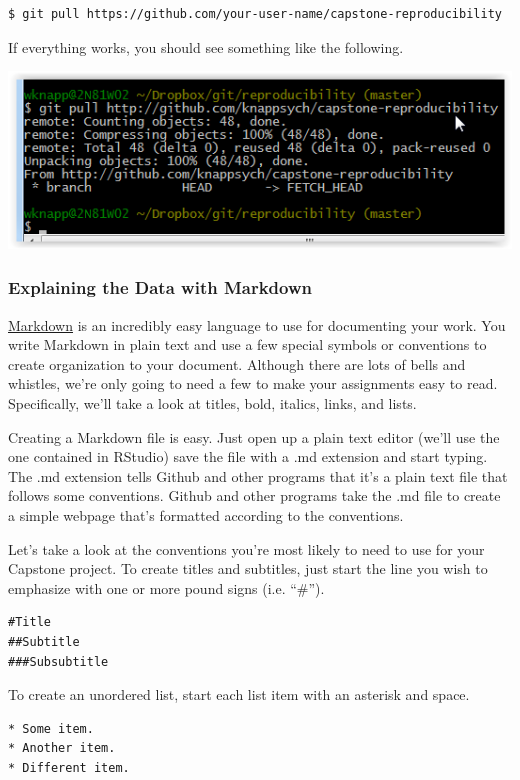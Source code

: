 \documentclass[12pt]{article}
\begin{document}
\begin{verbatim}
$ git pull https://github.com/your-user-name/capstone-reproducibility
\end{verbatim}

If everything works, you should see something like the following.

\includegraphics{imgs/Github08.PNG}

\subsubsection{Explaining the Data with Markdown}
\href{http://en.wikipedia.org/wiki/Markdown}{Markdown} is an incredibly easy language to use for
documenting your work. You write Markdown in plain text and use a few special symbols or conventions
to create organization to your document. Although there are lots of bells and whistles, we're only
going to need a few to make your assignments easy to read. Specifically, we'll take a look at titles,
bold, italics, links, and lists.

Creating a Markdown file is easy. Just open up a plain text editor (we'll use the one contained in
RStudio) save the file with a .md extension and start typing. The .md extension tells Github and
other programs that it's a plain text file that follows some conventions. Github and other programs
take the .md file to create a simple webpage that's formatted according to the conventions. 

Let's take a look at the conventions you're most likely to need to use for your Capstone project. To
create titles and subtitles, just start the line you wish to emphasize with one or more pound signs
(i.e. ``\#'').

\begin{verbatim}
#Title
##Subtitle
###Subsubtitle
\end{verbatim}

To create an unordered list, start each list item with an asterisk and space.

\begin{verbatim}
* Some item.
* Another item.
* Different item.
\end{verbatim}
\end{document}
